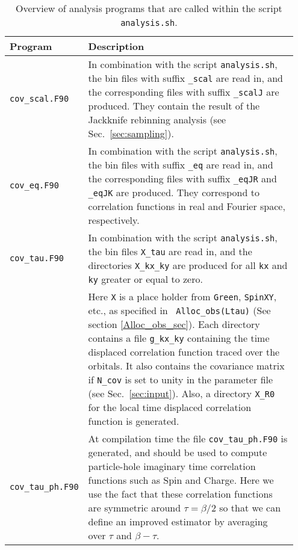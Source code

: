 \begin{table}[h]
	\begin{center}
	\begin{tabular}{@{} p{0.15\linewidth} p{0.8\linewidth} @{}}\toprule
		Program & Description \\\midrule
		\texttt{cov\_scal.F90}  &  In combination with the script \texttt{analysis.sh}, the bin files with suffix \texttt{\_scal} are read in, and  the corresponding files with suffix \texttt{\_scalJ} are produced. They  contain the  result of the Jackknife rebinning analysis  (see Sec.~\ref{sec:sampling}).  \\
		\texttt{cov\_eq.F90}    &  In combination with the script \texttt{analysis.sh}, the bin files with suffix \texttt{\_eq} are read in, and the corresponding files with suffix  \texttt{\_eqJR}  and  \texttt{\_eqJK}  are produced. They  correspond to correlation functions in real and Fourier space, respectively.  \\
		\texttt{cov\_tau.F90}   &  In combination with the script \texttt{analysis.sh}, the bin files  \texttt{X\_tau} are read in, and the directories  \texttt{X\_kx\_ky} are produced  for all \texttt{kx} and \texttt{ky} greater or equal to zero. \\
		& Here \texttt{X}  is a place holder from \texttt{Green}, \texttt{SpinXY}, etc., as specified in \texttt{ Alloc\_obs(Ltau)} (See section \ref{Alloc_obs_sec}). Each directory contains  a  file    \texttt{g\_kx\_ky}  containing the  time displaced correlation function traced over the  orbitals.  It also contains the covariance matrix if \texttt{N\_cov} is set to unity in the parameter file  (see Sec.~\ref{sec:input}). Also, a directory  \texttt{X\_R0}  for the local  time displaced  correlation function is generated.  \\                         
		\texttt{cov\_tau\_ph.F90} & At compilation time  the file \texttt{cov\_tau\_ph.F90} is generated, and  should be used to compute particle-hole  imaginary time correlation functions such as Spin and Charge. Here we use the fact that these  correlation functions  are symmetric around $\tau = \beta/2$ so that we can define an improved estimator by averaging over $\tau$ and $\beta - \tau$.  
		\\\bottomrule
	\end{tabular}
	\caption{ Overview of analysis programs that are called within the script \texttt{analysis.sh}. \label{table:analysis_programs}}
\end{center}
\end{table}
